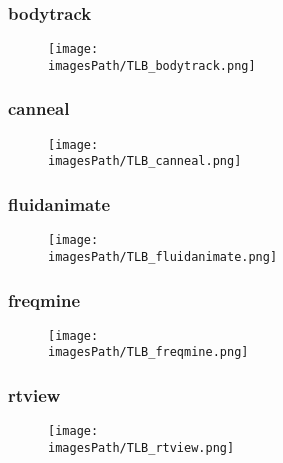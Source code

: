 \documentclass[12pt,a4paper]{article}
\newcommand{\imagesPath}{parsec-3.0/parsec_workspace/graphs}
\begin{document}
			\subsubsection{bodytrack}
				\begin{figure}[H]
					\begin{center}
						\texttt{[image: \\imagesPath/TLB\_bodytrack.png]}
					\end{center}
				\end{figure}
						
			\subsubsection{canneal}
				\begin{figure}[H]
					\begin{center}
						\texttt{[image: \\imagesPath/TLB\_canneal.png]}
					\end{center}
				\end{figure}
						
			\subsubsection{fluidanimate}
				\begin{figure}[H]
					\begin{center}
						\texttt{[image: \\imagesPath/TLB\_fluidanimate.png]}
					\end{center}
				\end{figure}
						
			\subsubsection{freqmine}
				\begin{figure}[H]
					\begin{center}
						\texttt{[image: \\imagesPath/TLB\_freqmine.png]}
					\end{center}
				\end{figure}
						
			\subsubsection{rtview}
				\begin{figure}[H]
					\begin{center}
						\texttt{[image: \\imagesPath/TLB\_rtview.png]}
					\end{center}
				\end{figure}
						
\end{document}
